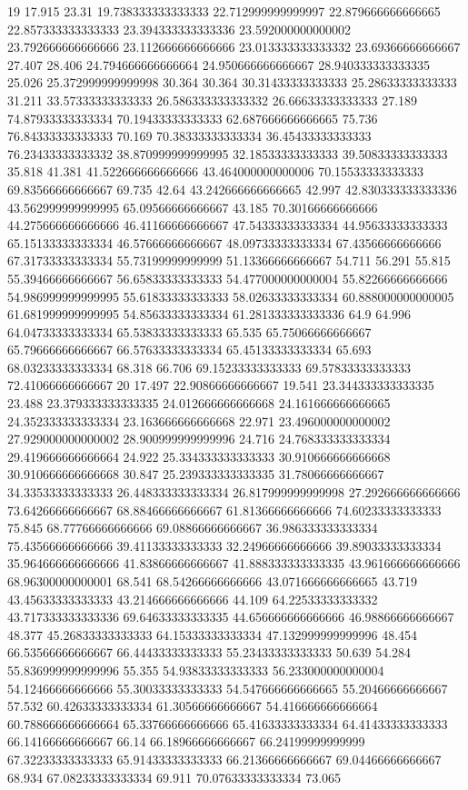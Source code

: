 19 17.915 23.31 19.738333333333333 22.712999999999997 22.879666666666665 22.857333333333333 23.394333333333336 23.592000000000002 23.792666666666666 23.112666666666666 23.013333333333332 23.69366666666667 27.407 28.406 24.794666666666664 24.950666666666667 28.940333333333335 25.026 25.372999999999998 30.364 30.364 30.31433333333333 25.28633333333333 31.211 33.57333333333333 26.586333333333332 26.66633333333333 27.189 74.87933333333334 70.19433333333333 62.687666666666665 75.736 76.84333333333333 70.169 70.38333333333334 36.45433333333333 76.23433333333332 38.870999999999995 32.18533333333333 39.50833333333333 35.818 41.381 41.522666666666666 43.464000000000006 70.15533333333333 69.83566666666667 69.735 42.64 43.242666666666665 42.997 42.830333333333336 43.562999999999995 65.09566666666667 43.185 70.30166666666666 44.275666666666666 46.41166666666667 47.54333333333334 44.95633333333333 65.15133333333334 46.57666666666667 48.09733333333334 67.43566666666666 67.31733333333334 55.73199999999999 51.13366666666667 54.711 56.291 55.815 55.39466666666667 56.65833333333333 54.477000000000004 55.82266666666666 54.986999999999995 55.61833333333333 58.02633333333334 60.888000000000005 61.681999999999995 54.85633333333334 61.281333333333336 64.9 64.996 64.04733333333334 65.53833333333333 65.535 65.75066666666667 65.79666666666667 66.57633333333334 65.45133333333334 65.693 68.03233333333334 68.318 66.706 69.15233333333333 69.57833333333333 72.41066666666667
20 17.497 22.90866666666667 19.541 23.344333333333335 23.488 23.379333333333335 24.012666666666668 24.161666666666665 24.352333333333334 23.163666666666668 22.971 23.496000000000002 27.929000000000002 28.900999999999996 24.716 24.768333333333334 29.419666666666664 24.922 25.334333333333333 30.910666666666668 30.910666666666668 30.847 25.239333333333335 31.78066666666667 34.33533333333333 26.448333333333334 26.817999999999998 27.292666666666666 73.64266666666667 68.88466666666667 61.81366666666666 74.60233333333333 75.845 68.77766666666666 69.08866666666667 36.986333333333334 75.43566666666666 39.41133333333333 32.24966666666666 39.89033333333334 35.964666666666666 41.83866666666667 41.888333333333335 43.961666666666666 68.96300000000001 68.541 68.54266666666666 43.071666666666665 43.719 43.45633333333333 43.214666666666666 44.109 64.22533333333332 43.717333333333336 69.64633333333335 44.656666666666666 46.98866666666667 48.377 45.26833333333333 64.15333333333334 47.132999999999996 48.454 66.53566666666667 66.44433333333333 55.23433333333333 50.639 54.284 55.836999999999996 55.355 54.93833333333333 56.233000000000004 54.12466666666666 55.30033333333333 54.547666666666665 55.20466666666667 57.532 60.42633333333334 61.30566666666667 54.416666666666664 60.788666666666664 65.33766666666666 65.41633333333334 64.41433333333333 66.14166666666667 66.14 66.18966666666667 66.24199999999999 67.32233333333333 65.91433333333333 66.21366666666667 69.04466666666667 68.934 67.08233333333334 69.911 70.07633333333334 73.065
